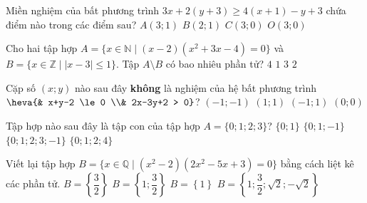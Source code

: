 \begin{ex}%
	Miền nghiệm của bất phương trình $3x + 2(y+3) \ge 4(x+1)-y+3$ chứa điểm nào trong các điểm sau?
	\choice
	{$A(3;1)$}
	{\True $B(2;1)$}
	{$C(3;0)$}
	{$O(3;0)$}
\end{ex}

\begin{ex}%
	Cho hai tập hợp $A = \{x\in \mathbb{N} \mid (x-2)(x^2+3x-4) = 0 \}$ và $B = \{x \in \mathbb{Z} \mid |x-3| \le 1 \}$. Tập $A\setminus B $ có bao nhiêu phần tử?
	\choice
	{$4$}
	{\True $1$}
	{$3$}
	{$2$}
\end{ex}
\begin{ex}%
	Cặp số $(x;y)$ nào sau đây \textbf{không} là nghiệm của hệ bất phương trình $\heva{& x+y-2 \le 0 \\& 2x-3y+2 > 0}$?
	\choice
	{$(-1;-1)$}
	{$(1;1)$}
	{\True $(-1;1)$}
	{$(0;0)$}
\end{ex}

\begin{ex}%
	Tập hợp nào sau đây là tập con của tập hợp $A = \{0; 1; 2; 3\}$?
	\choice
	{\True $\{0;1\}$}
	{$\{0;1;-1\}$}
	{$\{0;1;2;3;-1\}$}
	{$\{0;1;2;4\}$}
\end{ex}

\begin{ex}%
	Viết lại tập hợp $B = \{x \in \mathbb{Q} \mid (x^2-2)(2x^2-5x+3)=0 \}$ bằng cách liệt kê các phần tử.
	\choice
	{$B = \left\lbrace \dfrac{3}{2}\right\rbrace $}
	{\True $B = \left\lbrace 1; \dfrac{3}{2} \right\rbrace $}
	{$B = \left\lbrace 1\right\rbrace $}
	{$B = \left\lbrace1;\dfrac{3}{2}; \sqrt{2}; -\sqrt{2} \right\rbrace $}
\end{ex}

